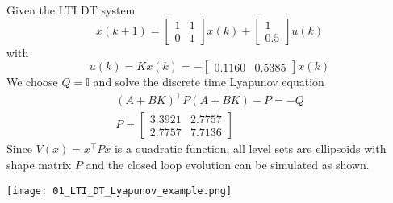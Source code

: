 \begin{examplesection}
    Given the LTI DT system
    \begin{equation*}
        x(k+1) = \begin{bmatrix}
            1 & 1 \\
            0 & 1
        \end{bmatrix} x(k) +
        \begin{bmatrix}
            1 \\
            0.5
        \end{bmatrix} u(k)
    \end{equation*}
    with
    \begin{equation*}
        u(k) = Kx(k) = -\begin{bmatrix}
            0.1160 & 0.5385
        \end{bmatrix} x(k)
    \end{equation*}
    We choose $Q=\mathbb{I}$ and solve the discrete time Lyapunov equation
    \begin{gather*}
        {\left(A+BK\right)}^\top P \left(A+BK\right) - P  = -Q \\
        P = \begin{bmatrix}
            3.3921 & 2.7757 \\
            2.7757 & 7.7136
        \end{bmatrix}
    \end{gather*}
    Since $V(x)=x^\top Px$ is a quadratic function, all level sets are ellipsoids with shape matrix $P$ and the closed loop evolution can be simulated as shown.
    \begin{center}
        \texttt{[image: 01\_LTI\_DT\_Lyapunov\_example.png]}
    \end{center}
\end{examplesection}